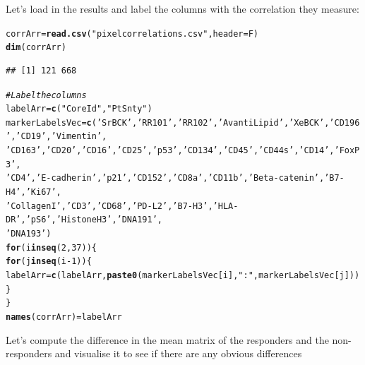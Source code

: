 \documentclass[a4paper]{article}\usepackage[]{graphicx}\usepackage[]{color}
\makeatletter
\newcommand{\hlnum}[1]{\textcolor[rgb]{0.686,0.059,0.569}{#1}}%
\newcommand{\hlstr}[1]{\textcolor[rgb]{0.192,0.494,0.8}{#1}}%
\newcommand{\hlcom}[1]{\textcolor[rgb]{0.678,0.584,0.686}{\textit{#1}}}%
\newcommand{\hlopt}[1]{\textcolor[rgb]{0,0,0}{#1}}%
\newcommand{\hlstd}[1]{\textcolor[rgb]{0.345,0.345,0.345}{#1}}%
\newcommand{\hlkwa}[1]{\textcolor[rgb]{0.161,0.373,0.58}{\textbf{#1}}}%
\newcommand{\hlkwb}[1]{\textcolor[rgb]{0.69,0.353,0.396}{#1}}%
\newcommand{\hlkwc}[1]{\textcolor[rgb]{0.333,0.667,0.333}{#1}}%
\newcommand{\hlkwd}[1]{\textcolor[rgb]{0.737,0.353,0.396}{\textbf{#1}}}%
\newenvironment{kframe}{%
 \def\at@end@of@kframe{}%
 \ifinner\ifhmode%
  \def\at@end@of@kframe{\end{minipage}}%
  \begin{minipage}{\columnwidth}%
 \fi\fi%
 \def\FrameCommand##1{\hskip\@totalleftmargin \hskip-\fboxsep
 \colorbox{shadecolor}{##1}\hskip-\fboxsep
     \hskip-\linewidth \hskip-\@totalleftmargin \hskip\columnwidth}%
 \MakeFramed {\advance\hsize-\width
   \@totalleftmargin\z@ \linewidth\hsize
   \@setminipage}}%
 {\par\unskip\endMakeFramed%
 \at@end@of@kframe}
\newenvironment{knitrout}{}{} %
\makeatother
\begin{document}
Let's load in the results and label the columns with the correlation they measure:
\begin{knitrout}
\color{fgcolor}\begin{kframe}
\begin{alltt}
\hlstd{corrArr} \hlkwb{=} \hlkwd{read.csv}\hlstd{(}\hlstr{"pixelcorrelations.csv"}\hlstd{,}\hlkwc{header}\hlstd{=F)}
\hlkwd{dim}\hlstd{(corrArr)}
\end{alltt}
\begin{verbatim}
## [1] 121 668
\end{verbatim}
\begin{alltt}
\hlcom{# Label the columns}
\hlstd{labelArr} \hlkwb{=} \hlkwd{c}\hlstd{(}\hlstr{"CoreId"}\hlstd{,}\hlstr{"PtSnty"}\hlstd{)}
\hlstd{markerLabelsVec} \hlkwb{=} \hlkwd{c}\hlstd{(}\hlstr{'SrBCK'}\hlstd{,} \hlstr{'RR101'}\hlstd{,} \hlstr{'RR102'}\hlstd{,} \hlstr{'AvantiLipid'}\hlstd{,} \hlstr{'XeBCK'}\hlstd{,} \hlstr{'CD196'}\hlstd{,} \hlstr{'CD19'}\hlstd{,} \hlstr{'Vimentin'}\hlstd{,}
                    \hlstr{'CD163'}\hlstd{,} \hlstr{'CD20'}\hlstd{,} \hlstr{'CD16'}\hlstd{,} \hlstr{'CD25'}\hlstd{,} \hlstr{'p53'}\hlstd{,} \hlstr{'CD134'}\hlstd{,} \hlstr{'CD45'}\hlstd{,} \hlstr{'CD44s'}\hlstd{,} \hlstr{'CD14'}\hlstd{,} \hlstr{'FoxP3'}\hlstd{,}
                    \hlstr{'CD4'}\hlstd{,} \hlstr{'E-cadherin'}\hlstd{,} \hlstr{'p21'}\hlstd{,} \hlstr{'CD152'}\hlstd{,} \hlstr{'CD8a'}\hlstd{,} \hlstr{'CD11b'}\hlstd{,} \hlstr{'Beta-catenin'}\hlstd{,} \hlstr{'B7-H4'}\hlstd{,} \hlstr{'Ki67'}\hlstd{,}
                    \hlstr{'CollagenI'}\hlstd{,} \hlstr{'CD3'}\hlstd{,} \hlstr{'CD68'}\hlstd{,} \hlstr{'PD-L2'}\hlstd{,} \hlstr{'B7-H3'}\hlstd{,} \hlstr{'HLA-DR'}\hlstd{,} \hlstr{'pS6'}\hlstd{,} \hlstr{'HistoneH3'}\hlstd{,} \hlstr{'DNA191'}\hlstd{,}
                    \hlstr{'DNA193'}\hlstd{)}
\hlkwa{for} \hlstd{(i} \hlkwa{in} \hlkwd{seq}\hlstd{(}\hlnum{2}\hlstd{,}\hlnum{37}\hlstd{)) \{}
  \hlkwa{for} \hlstd{(j} \hlkwa{in} \hlkwd{seq}\hlstd{(i}\hlopt{-}\hlnum{1}\hlstd{)) \{}
    \hlstd{labelArr} \hlkwb{=} \hlkwd{c}\hlstd{(labelArr,}\hlkwd{paste0}\hlstd{(markerLabelsVec[i],}\hlstr{":"}\hlstd{,markerLabelsVec[j]))}
  \hlstd{\}}
\hlstd{\}}
\hlkwd{names}\hlstd{(corrArr)} \hlkwb{=} \hlstd{labelArr}
\end{alltt}
\end{kframe}
\end{knitrout}

Let's compute the difference in the mean matrix of the responders and the non-responders and visualise it to see if there are any obvious differences
\end{document}
